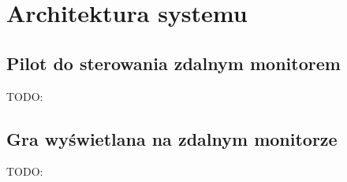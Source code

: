 \section{Architektura systemu}

\subsection{Pilot do sterowania zdalnym monitorem}

TODO:

\subsection{Gra wyświetlana na zdalnym monitorze}

TODO:
